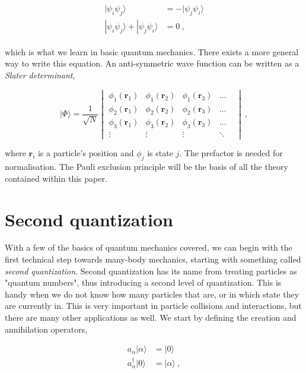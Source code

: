 \documentclass[10pt,twoside]{report}
\begin{document}
	\begin{align}
		\begin{split}
		|\psi_i\psi_j\rangle &= -|\psi_j\psi_i\rangle \\
		|\psi_i\psi_j\rangle + |\psi_j\psi_i\rangle &= 0 \:,
		\end{split}
		\label{MBQM | eq | "pauli principle"}
	\end{align}
	
	\noindent which is what we learn in basic quantum mechanics. There exists a more general way to write this equation. An anti-symmetric wave function can be written as a \emph{Slater determinant},
	
	\begin{equation}
		|\Phi\rangle = \frac{1}{\sqrt{N}}\begin{vmatrix}
		\phi_1(\bm{r}_1) & \phi_1(\bm{r}_2) & \phi_1(\bm{r}_3) & \ldots &\\
		\phi_2(\bm{r}_1) & \phi_2(\bm{r}_2) & \phi_2(\bm{r}_3) & \ldots &\\
		\phi_3(\bm{r}_1) & \phi_3(\bm{r}_2) & \phi_3(\bm{r}_3) & \ldots &\\
		\vdots & \vdots & \vdots & \ddots &
		\end{vmatrix} \:,
	\end{equation}
	
	\noindent where $\bm{r}_i$ is a particle's position and $\phi_j$ is state $j$. The prefactor is needed for normalisation. The Pauli exclusion principle will be the basis of all the theory contained within this paper.
	
	\section{Second quantization}
	
	With a few of the basics of quantum mechanics covered, we can begin with the first technical step towards many-body mechanics, starting with something called \emph{second quantization}. Second quantization has its name from treating particles as "quantum numbers", thus introducing a second level of quantization. This is handy when we do not know how many particles that are, or in which state they are currently in. This is very important in particle collisions and interactions, but there are many other applications as well. We start by defining the creation and annihilation operators,
	
	\begin{align}
		a_\alpha|\alpha\rangle &= |0\rangle\\
		a_\alpha^\dagger|0\rangle &= |\alpha\rangle\:,
	\end{align}
	
\end{document}
